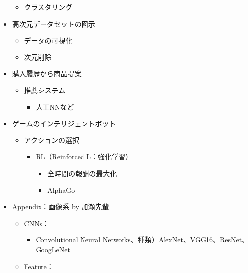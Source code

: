 \begin{itemize}
  \begin{itemize}
  \tightlist
  \item
    クラスタリング
  \end{itemize}
\item
  高次元データセットの図示

  \begin{itemize}
  \tightlist
  \item
    データの可視化
  \item
    次元削除
  \end{itemize}
\item
  購入履歴から商品提案

  \begin{itemize}
  \tightlist
  \item
    推薦システム

    \begin{itemize}
    \tightlist
    \item
      人工NNなど
    \end{itemize}
  \end{itemize}
\item
  ゲームのインテリジェントボット

  \begin{itemize}
  \tightlist
  \item
    アクションの選択

    \begin{itemize}
    \tightlist
    \item
      RL（Reinforced L：強化学習）

      \begin{itemize}
      \tightlist
      \item
        全時間の報酬の最大化
      \item
        AlphaGo
      \end{itemize}
    \end{itemize}
  \end{itemize}
\item
  Appendix：画像系 by 加瀬先輩

  \begin{itemize}
  \tightlist
  \item
    CNNs：

    \begin{itemize}
    \tightlist
    \item
      Convolutional Neural
      Networks、種類）AlexNet、VGG16、ResNet、GoogLeNet
    \end{itemize}
  \item
    Feature：


\end{itemize}
\end{itemize}
